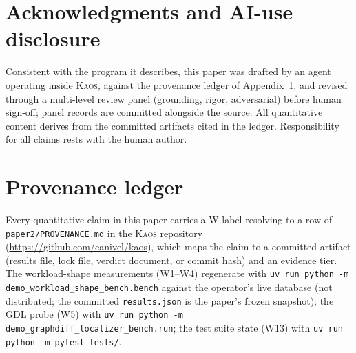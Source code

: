 \documentclass[11pt]{article}
\newcommand{\kaos}{\textsc{Kaos}}
\begin{document}
\section*{Acknowledgments and AI-use disclosure}

Consistent with the program it describes, this paper was drafted by an agent operating inside \kaos{}, against the provenance ledger of Appendix~\ref{app:provenance}, and revised through a multi-level review panel (grounding, rigor, adversarial) before human sign-off; panel records are committed alongside the source. All quantitative content derives from the committed artifacts cited in the ledger. Responsibility for all claims rests with the human author.




\appendix

\section{Provenance ledger}
\label{app:provenance}

Every quantitative claim in this paper carries a W-label resolving to a row of \texttt{paper2/PROVENANCE.md} in the \kaos{} repository (\url{https://github.com/canivel/kaos}), which maps the claim to a committed artifact (results file, lock file, verdict document, or commit hash) and an evidence tier. The workload-shape measurements (W1--W4) regenerate with \texttt{uv run python -m demo\_workload\_shape\_bench.bench} against the operator's live database (not distributed; the committed \texttt{results.json} is the paper's frozen snapshot); the GDL probe (W5) with \texttt{uv run python -m demo\_graphdiff\_localizer\_bench.run}; the test suite state (W13) with \texttt{uv run python -m pytest tests/}.
\end{document}
